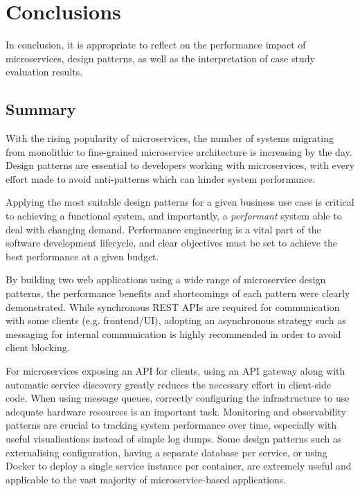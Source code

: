 \chapter{Conclusions}

In conclusion, it is appropriate to reflect on the performance impact of microservices, design patterns, as well as the interpretation of case study evaluation results.

\section{Summary}

With the rising popularity of microservices, the number of systems migrating from monolithic to fine-grained microservice architecture is increasing by the day. Design patterns are essential to developers working with microservices, with every effort made to avoid anti-patterns which can hinder system performance.

Applying the most suitable design patterns for a given business use case is critical to achieving a functional system, and importantly, a \textit{performant} system able to deal with changing demand. Performance engineering is a vital part of the software development lifecycle, and clear objectives must be set to achieve the best performance at a given budget.

By building two web applications using a wide range of microservice design patterns, the performance benefits and shortcomings of each pattern were clearly demonstrated. While synchronous REST APIs are required for communication with some clients (e.g. frontend/UI), adopting an asynchronous strategy such as messaging for internal communication is highly recommended in order to avoid client blocking.

For microservices exposing an API for clients, using an API gateway along with automatic service discovery greatly reduces the necessary effort in client-side code. When using message queues, correctly configuring the infrastructure to use adequate hardware resources is an important task. Monitoring and observability patterns are crucial to tracking system performance over time, especially with useful visualisations instead of simple log dumps. Some design patterns such as externalising configuration, having a separate database per service, or using Docker to deploy a single service instance per container, are extremely useful and applicable to the vast majority of microservice-based applications.

